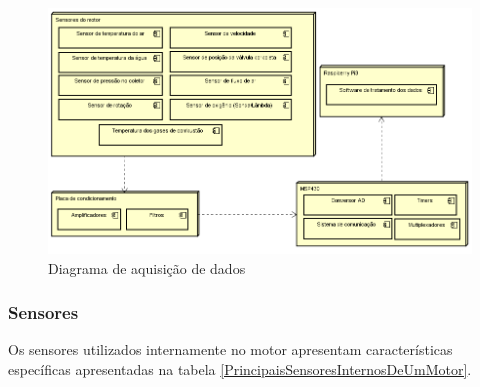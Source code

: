 \begin{figure}[h!]
	\centering
	\includegraphics[keepaspectratio=true,scale= 1.0, angle=90]{figuras/Diagrama.PNG}
	\caption{Diagrama de aquisição de dados}
	\label{diagramaDeAquisicaoDeDados}
\end{figure}
\pagebreak

\subsubsection{Sensores}

Os sensores utilizados internamente no motor apresentam características específicas apresentadas na tabela \ref{PrincipaisSensoresInternosDeUmMotor}.

